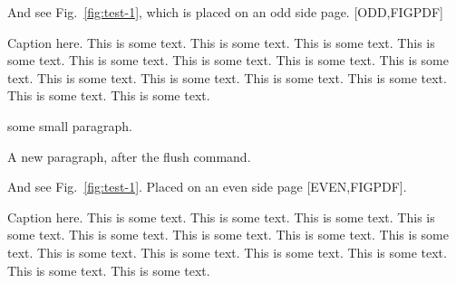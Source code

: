 \documentclass[12pt,a5paper]{book}
\begin{document}
\lipsum[5-7]


\cleardoublepage
\lipsum[1-3]

And see Fig.~\ref{fig:test-1}, which is placed on an odd side page. [ODD,FIGPDF]

\begin{fullpagefigure}
  \caption{Caption here. This is some text. This is some text. This is some text. This is
    some text. This is some text. This is some text. This is some text. This is some
    text. This is some text. This is some text. This is some text. This is some text. This
    is some text. This is some text. }
  \label{fig:test-1}
\end{fullpagefigure}

some small paragraph.

\FlushAllFullPageFigures

A new paragraph, after the flush command.

\lipsum[5-7]


\cleardoublepage
\lipsum[1-3]

And see Fig.~\ref{fig:test-1}. Placed on an even side page [EVEN,FIGPDF].

\begin{fullpagefigure}
  \caption{Caption here. This is some text. This is some text. This is some text. This is
    some text. This is some text. This is some text. This is some text. This is some
    text. This is some text. This is some text. This is some text. This is some text. This
    is some text. This is some text. }
  \label{fig:test-1}
\end{fullpagefigure}

\lipsum[5-7]
\end{document}
